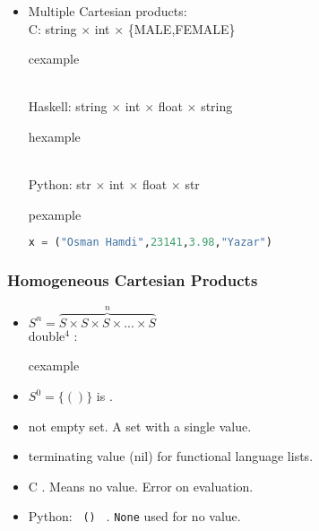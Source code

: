 \begin{frame}[fragile]
\begin{itemize}
 \item Multiple Cartesian products:\\
C: string $\times$ int $\times$ \{MALE,FEMALE\}
\begin{beamercolorbox}{cexample}
 \codecartC
\end{beamercolorbox}\\
Haskell: string $\times$ int $\times$ float $\times$ string
\begin{beamercolorbox}{hexample}
 \codecartH
\end{beamercolorbox}\\
Python: str $\times$ int $\times$ float $\times$ str\\
\begin{beamercolorbox}{pexample}
\begin{lstlisting}[language=python]
x = ("Osman Hamdi",23141,3.98,"Yazar")
\end{lstlisting}
\end{beamercolorbox}
\end{itemize}

\end{frame}


\begin{frame}
\frametitle{Homogeneous Cartesian Products}
\begin{itemize}
 \item $S^n = \overbrace{S \times S \times S \times ... \times S}^{n}$\\
double$^4$ :
\begin{beamercolorbox}{cexample}
\codehomC 
\end{beamercolorbox}
\item $S^0 = \{ () \}$ is .
\item \alert{not} empty set. A set with a single value.
\item terminating value (nil) for functional language lists.
\item C \texttt{}. Means no value. Error on evaluation.
\item Python: \texttt{ () } . \lstinline!None! used for no value.
\end{itemize}
\end{frame}

